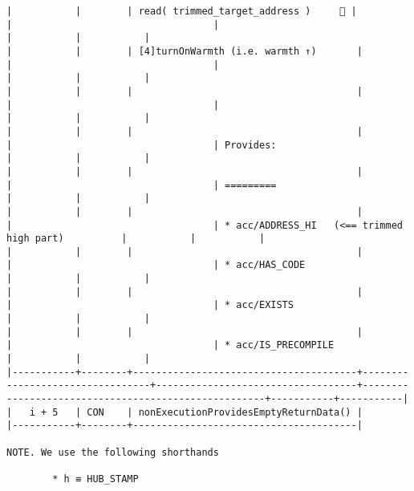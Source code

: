 \documentclass[varwidth=\maxdimen,margin=0.5cm,multi={verbatim}]{standalone}
\begin{document}
\begin{verbatim}
|           |        | read( trimmed_target_address )     👋 |                                 |                                   |                                                     |           |           |
|           |        | [4]turnOnWarmth (i.e. warmth ↑)       |                                 |                                   |                                                     |           |           |
|           |        |                                       |                                 |                                   |                                                     |           |           |
|           |        |                                       |                                 |                                   | Provides:                                           |           |           |
|           |        |                                       |                                 |                                   | =========                                           |           |           |
|           |        |                                       |                                 |                                   | * acc/ADDRESS_HI   (<== trimmed high part)          |           |           |
|           |        |                                       |                                 |                                   | * acc/HAS_CODE                                      |           |           |
|           |        |                                       |                                 |                                   | * acc/EXISTS                                        |           |           |
|           |        |                                       |                                 |                                   | * acc/IS_PRECOMPILE                                 |           |           |
|-----------+--------+---------------------------------------+---------------------------------+-----------------------------------+-----------------------------------------------------+-----------+-----------|
|   i + 5   | CON    | nonExecutionProvidesEmptyReturnData() |
|-----------+--------+---------------------------------------|

NOTE. We use the following shorthands

        * h ≡ HUB_STAMP

\end{verbatim}
\end{document}
